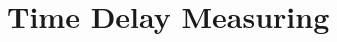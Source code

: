 \documentclass[ExampleMasters.tex]{subfiles}
\begin{document}
\chapter{Time Delay Measuring}


\section{}
\end{document}
